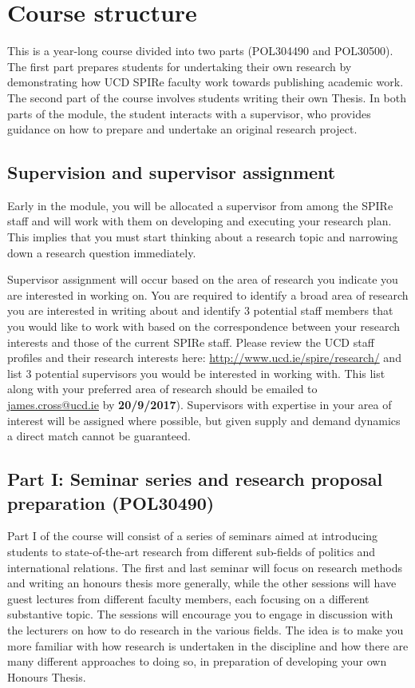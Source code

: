 \documentclass[a4paper,12pt]{article}
\begin{document}
\section*{Course structure}

	This is a year-long course divided into two parts (POL304490 and POL30500). The first part prepares students for undertaking their own research by demonstrating how UCD SPIRe faculty work towards publishing academic work. The second part of the course involves students writing their own Thesis. In both parts of the module, the student interacts with a supervisor, who provides guidance on how to prepare and undertake an original research project.

\subsection*{Supervision and supervisor assignment}

	Early in the module, you will be allocated a supervisor from among the SPIRe staff and will work with them on developing and executing your research plan. This implies that you must start thinking about a research topic and narrowing down a research question immediately.
	
	Supervisor assignment will occur based on the area of research you indicate you are interested in working on. You are required to identify a broad area of research you are interested in writing about and identify 3 potential staff members that you would like to work with based on the correspondence between your research interests and those of the current SPIRe staff. Please review the UCD staff profiles and their research interests here: \url{http://www.ucd.ie/spire/research/} and list 3 potential supervisors you would be interested in working with. This list along with your preferred area of research should be emailed to \url{james.cross@ucd.ie} by \textbf{20/9/2017}). Supervisors with expertise in your area of interest will be assigned where possible, but given supply and demand dynamics a direct match cannot be guaranteed.
	

\subsection*{Part I: Seminar series and research proposal preparation (POL30490)}

	Part I of the course will consist of a series of seminars aimed at introducing students to state-of-the-art research from different sub-fields of politics and international relations. The first and last seminar will focus on research methods and writing an honours thesis more generally, while the other sessions will have guest lectures from different faculty members, each focusing on a different substantive topic. The sessions will encourage you to engage in discussion with the lecturers on how to do research in the various fields. The idea is to make you more familiar with how research is undertaken in the discipline and how there are many different approaches to doing so, in preparation of developing your own Honours Thesis. 
	
\end{document}
